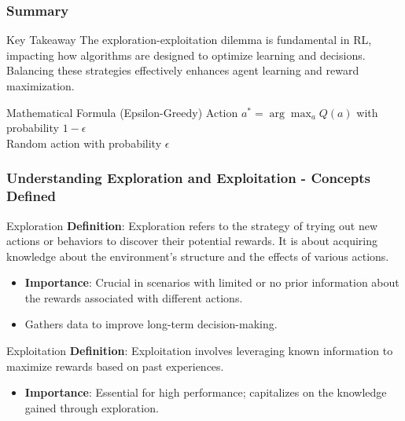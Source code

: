 \documentclass[aspectratio=169]{beamer}
\begin{document}
\begin{frame}[fragile]
    \frametitle{Summary}
    \begin{block}{Key Takeaway}
        The exploration-exploitation dilemma is fundamental in RL, impacting how algorithms are designed to optimize learning and decisions. Balancing these strategies effectively enhances agent learning and reward maximization.
    \end{block}
    \begin{block}{Mathematical Formula (Epsilon-Greedy)}
        Action \( a^* = \arg\max_a Q(a) \) with probability \( 1 - \epsilon \) \\ Random action with probability \( \epsilon \)
    \end{block}
\end{frame}

\begin{frame}[fragile]
    \frametitle{Understanding Exploration and Exploitation - Concepts Defined}
    \begin{block}{Exploration}
        \textbf{Definition}: Exploration refers to the strategy of trying out new actions or behaviors to discover their potential rewards. It is about acquiring knowledge about the environment's structure and the effects of various actions. 
        \begin{itemize}
            \item \textbf{Importance}: Crucial in scenarios with limited or no prior information about the rewards associated with different actions. 
            \item Gathers data to improve long-term decision-making.
        \end{itemize}
    \end{block}
    
    \begin{block}{Exploitation}
        \textbf{Definition}: Exploitation involves leveraging known information to maximize rewards based on past experiences.
        \begin{itemize}
            \item \textbf{Importance}: Essential for high performance; capitalizes on the knowledge gained through exploration.
        \end{itemize}
    \end{block}
\end{frame}
\end{document}
